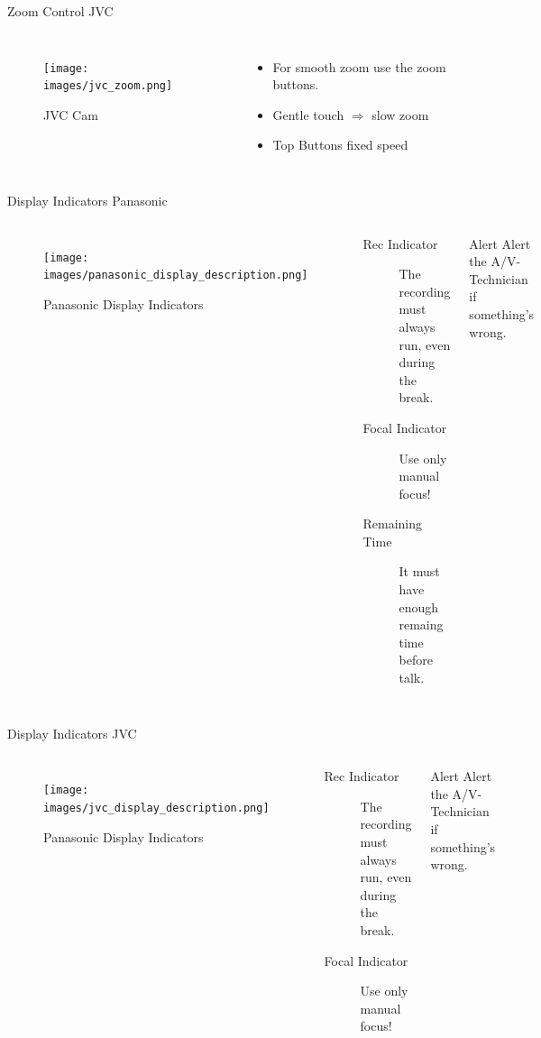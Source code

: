 \documentclass[aspectratio=169]{beamer}
\begin{document}
\begin{frame}{Zoom Control JVC}
	\begin{columns}[T,onlytextwidth]
	\begin{figure} 
		\centering
		\texttt{[image: images/jvc\_zoom.png]}
		\caption{JVC Cam}
	\end{figure}
		\begin{itemize}
			\item For smooth zoom use the zoom buttons.
			\item Gentle touch $\Rightarrow$ slow zoom
			\item Top Buttons fixed speed
		\end{itemize}
	\end{columns}
\end{frame}


\begin{frame}{Display Indicators Panasonic}
	\begin{columns}[T,onlytextwidth]
	\begin{figure} 
		\centering
		\texttt{[image: images/panasonic\_display\_description.png]}
		\caption{Panasonic Display Indicators}
	\end{figure}
		\begin{description}
			\item[Rec Indicator] The recording must always run, even during the break.
			\item[Focal Indicator] Use only manual focus!
			\item[Remaining Time] It must have enough remaing time before talk.
		\end{description}
		\begin{alertblock}{Alert}
			Alert the A/V-Technician if something's wrong.
		\end{alertblock}
	\end{columns}
\end{frame}

\begin{frame}{Display Indicators JVC}
	\begin{columns}[T,onlytextwidth]
	\begin{figure} 
		\centering
		\texttt{[image: images/jvc\_display\_description.png]}
		\caption{Panasonic Display Indicators}
	\end{figure}
		\begin{description}
			\item[Rec Indicator] The recording must always run, even during the break.
			\item[Focal Indicator] Use only manual focus!
		\end{description}
		\begin{alertblock}{Alert}
			Alert the A/V-Technician if something's wrong.
		\end{alertblock}
	\end{columns}
\end{frame}
\end{document}
